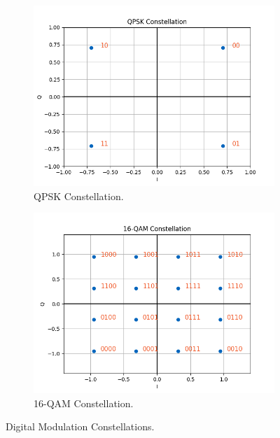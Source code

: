 \begin{figure}[H]
    \centering
    \begin{subfigure}[t]{0.5\textwidth}
        \centering
        \includegraphics[width=\textwidth]{Images/Const_QPSK.png}
        \caption{QPSK Constellation.}
        \label{fig:QPSK_const}
    \end{subfigure}%
    \begin{subfigure}[t]{0.5\textwidth}
        \centering
        \includegraphics[width=\textwidth]{Images/Const_16QAM.png}
        \caption{16-QAM Constellation.}
        \label{fig:16QAM_const}
    \end{subfigure}
    \caption{Digital Modulation Constellations.}
    \label{fig:Const}
\end{figure}

